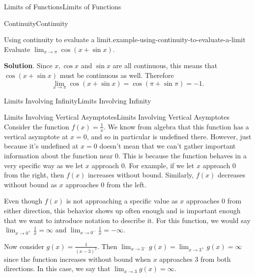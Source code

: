 \documentclass[10pt,]{book}
\numberwithin{equation}{section}
\begin{document}
\begin{chapterptx}{Limits of Functions}{}{Limits of Functions}{}{}
\begin{sectionptx}{Continuity}{}{Continuity}{}{}
\begin{example}{Using continuity to evaluate a limit.}{example-using-continuity-to-evaluate-a-limit}%
\hypertarget{p-50}{}%
Evaluate \(\lim_{x\to\pi}\cos(x+\sin x)\).%
\par\smallskip%
\noindent\textbf{Solution}.\hypertarget{solution-10}{}\quad%
\hypertarget{p-51}{}%
Since \(x, \cos x\) and \(\sin x\) are all continuous, this means that \(\cos(x+\sin x)\) must be continuous as well. Therefore%
\begin{equation*}
\lim_{x\to\pi}\cos(x+\sin x) = \cos(\pi+\sin\pi) = -1.
\end{equation*}
%
\end{example}
\end{sectionptx}
%
%
\typeout{************************************************}
\typeout{************************************************}
%
\begin{sectionptx}{Limits Involving Infinity}{}{Limits Involving Infinity}{}{}\label{section-limits-involving-infinity}
%
%
\typeout{************************************************}
\typeout{************************************************}
%
\begin{subsectionptx}{Limits Involving Vertical Asymptotes}{}{Limits Involving Vertical Asymptotes}{}{}\label{subsection-limits-involving-vertical-asymptotes}
\hypertarget{p-52}{}%
Consider the function \(f(x)=\frac{1}{x}\). We know from algebra that this function has a vertical asymptote at \(x=0\), and so in particular is undefined there. However, just because it's undefined at \(x=0\) doesn't mean that we can't gather important information about the function near \(0\). This is because the function behaves in a very specific way as we let \(x\) approach \(0\). For example, if we let \(x\) approach \(0\) from the right, then \(f(x)\) increases without bound. Similarly, \(f(x)\) decreases without bound as \(x\) approaches \(0\) from the left.%
\par
\hypertarget{p-53}{}%
Even though \(f(x)\) is not approaching a specific value as \(x\) approaches \(0\) from either direction, this behavior shows up often enough and is important enough that we want to introduce notation to describe it. For this function, we would say \(\lim_{x\to0^{+}}\frac{1}{x}=\infty\) and \(\lim_{x\to0^{-}}\frac{1}{x}=-\infty\).%
\par
\hypertarget{p-54}{}%
Now consider \(g(x) = \frac{1}{(x-3)^{2}}\). Then \(\lim_{x\to3^{-}}g(x) = \lim_{x\to3^{+}}g(x) = \infty\) since the function increases without bound when \(x\) approaches \(3\) from both directions. In this case, we say that \(\lim_{x\to3}g(x)=\infty\).%

\end{subsectionptx}
\end{sectionptx}
\end{chapterptx}
\end{document}

